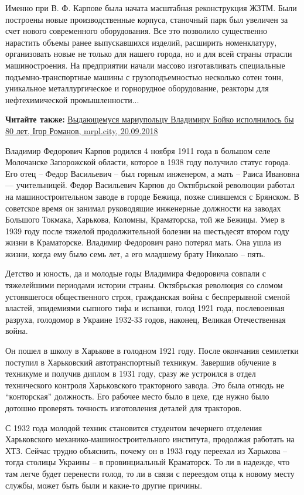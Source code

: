 Именно при В. Ф. Карпове была начата масштабная реконструкция ЖЗТМ. Были
построены новые производственные корпуса, станочный парк был увеличен за счет
нового современного оборудования. Все это позволило существенно нарастить
объемы ранее выпускавшихся изделий, расширить номенклатуру, организовать новые
не только для нашего города, но и для всей страны отрасли машиностроения. На
предприятии начали массово изготавливать специальные  подъемно-транспортные
машины с грузоподъемностью несколько сотен тонн, уникальное металлургическое и
горнорудное оборудование, реакторы для нефтехимической промышленности...

\textbf{Читайте также:} \href{https://mrpl.city/news/view/vydayushhemusya-mariupoltsu-vladimiru-bojko-ispolnilos-by-80-let}{%
Выдающемуся мариупольцу Владимиру Бойко исполнилось бы 80 лет, Ігор Романов, mrpl.city, 20.09.2018}

Владимир Федорович Карпов родился 4 ноября 1911 года в большом селе Молочанске
Запорожской области, которое в 1938 году получило статус города. Его отец –
Федор Васильевич – был горным инженером, а мать – Раиса Ивановна —
учительницей. Федор Васильевич Карпов до Октябрьской революции работал на
машиностроительном заводе в городе Бежица, позже слившемся с Брянском. В
советское время он занимал руководящие инженерные должности на заводах Большого
Токмака, Харькова, Коломны, Краматорска, той же Бежицы. Умер в 1939 году после
тяжелой продолжительной болезни на шестьдесят втором году жизни в Краматорске.
Владимир Федорович рано потерял мать. Она ушла из жизни, когда ему было семь
лет, а его младшему брату Николаю – пять.

Детство и юность, да и молодые годы Владимира Федоровича совпали с тяжелейшими
периодами истории страны. Октябрьская революция со сломом устоявшегося
общественного строя, гражданская война с беспрерывной сменой властей,
эпидемиями сыпного тифа и испанки, голод 1921 года, послевоенная разруха,
голодомор в Украине 1932-33 годов, наконец, Великая Отечественная война.

Он пошел в школу в Харькове в голодном 1921 году. После окончания семилетки
поступил в Харьковский автотранспортный техникум. Завершив обучение в техникуме
и получив диплом в 1931 году, сразу же устроился в отдел технического контроля
Харьковского тракторного завода. Это была отнюдь не \enquote{конторская}
должность. Его рабочее место было в цехе, где нужно было дотошно проверять
точность изготовления деталей для тракторов.

С 1932 года молодой техник становится студентом вечернего отделения
Харьковского механико-машиностроительного института, продолжая работать на ХТЗ.
Сейчас трудно объяснить, почему он в 1933 году переехал из Харькова – тогда
столицы Украины – в провинциальный Краматорск. То ли в надежде, что там легче
будет перенести голод, то ли в связи с переездом отца к новому месту службы,
может быть были и какие-то другие причины.

